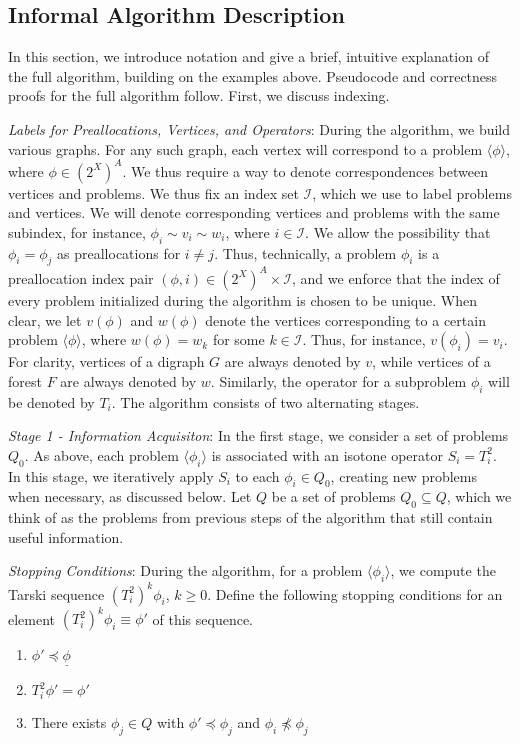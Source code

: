 \documentclass[11pt,reqno]{amsart}
\theoremstyle{definition}
\numberwithin{equation}{section}
\newcommand{\ul}{\underline}
\newcommand{\lag}{\langle}
\newcommand{\rag}{\rangle}
\newcommand{\pre}{\phi}
\newcommand{\prealloc}{(2^X)^A}
\newcommand{\sub}{\subseteq}
\newcommand{\peq}{\preceq}
\newcommand{\bopre}{\ul{\pre}}
\newcommand{\acto}{Q_0}
\newcommand{\act}{Q}
\begin{document}
\subsection{Informal Algorithm Description} 

In this section, we introduce notation and give a brief, intuitive explanation of the full algorithm, building on the examples above.
Pseudocode and correctness proofs for the full algorithm follow. 
First, we discuss indexing. 

\emph{Labels for Preallocations, Vertices, and Operators}:
During the algorithm, we build various graphs.
For any such graph, each vertex will correspond to a problem $\lag \pre \rag$, where $\pre \in \prealloc$.
We thus require a way to denote correspondences between vertices and problems.
We thus fix an index set $\mathcal{I}$, which we use to label problems and vertices.
We will denote corresponding vertices and problems with the same subindex, for instance, $\pre_i \sim v_i \sim w_i$, where $i \in \mathcal{I}$. 
We allow the possibility that $\pre_i = \pre_j$ as preallocations for $i \not = j$.
Thus, technically, a problem $\pre_i$ is a preallocation index pair $(\pre,i) \in \prealloc \times \mathcal{I}$, and we enforce that the index of every problem initialized during the algorithm is chosen to be unique.
When clear, we let $v(\pre)$ and $w(\pre)$ denote the vertices corresponding to a certain problem $\lag \pre \rag$, where $w(\pre) = w_k$ for some $k \in \mathcal{I}$.
Thus, for instance, $v(\pre_i) = v_i$.
For clarity, vertices of a digraph $G$ are always denoted by $v$, while vertices of a forest $F$ are always denoted by $w$.
Similarly, the operator for a subproblem $\pre_i$ will be denoted by $T_i$.
The algorithm consists of two alternating stages. 

\emph{Stage 1 - Information Acquisiton}: In the first stage, we consider a set of problems $\acto$.
As above, each problem $\lag \pre_i \rag$ is associated with an isotone operator $S_i = T_i^2$.
In this stage, we iteratively apply $S_i$ to each $\pre_i \in \acto$, creating new problems when necessary, as discussed below. 
Let $\act$ be a set of problems $\acto \sub \act$, which we think of as the problems from previous steps of the algorithm that still contain useful information.  

\emph{Stopping Conditions}:
During the algorithm, for a problem $\lag \pre_i \rag $, we compute the Tarski sequence $(T_i^2)^k \pre_i$, $k \geq 0$. 
Define the following stopping conditions for an element $ (T_i^2)^k \pre_i \equiv \pre'$ of this sequence.
\begin{enumerate}
\item $\pre' \peq \bopre$ \label{cond:bottom1}
\item $T_i^2 \pre'= \pre'$ \label{cond:fix1}
\item There exists $\pre_j\in \act$ with $\pre' \peq \pre_j$ and $\pre_i \not \peq \pre_j$ \label{cond:collide1}
\end{enumerate}
\end{document}
